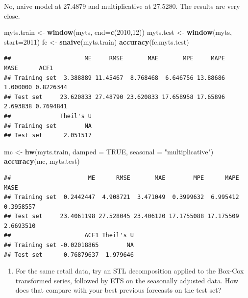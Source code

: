 \documentclass[]{article}
\newenvironment{Shaded}{\begin{snugshade}}{\end{snugshade}}
\newcommand{\KeywordTok}[1]{\textcolor[rgb]{0.13,0.29,0.53}{\textbf{#1}}}
\newcommand{\DataTypeTok}[1]{\textcolor[rgb]{0.13,0.29,0.53}{#1}}
\newcommand{\DecValTok}[1]{\textcolor[rgb]{0.00,0.00,0.81}{#1}}
\newcommand{\StringTok}[1]{\textcolor[rgb]{0.31,0.60,0.02}{#1}}
\newcommand{\OtherTok}[1]{\textcolor[rgb]{0.56,0.35,0.01}{#1}}
\newcommand{\NormalTok}[1]{#1}
\providecommand{\tightlist}{%
  \setlength{\itemsep}{0pt}\setlength{\parskip}{0pt}}
\begin{document}
No, naive model at 27.4879 and multiplicative at 27.5280. The results
are very close.

\begin{Shaded}
\begin{Highlighting}[]
\NormalTok{myts.train <-}\StringTok{ }\KeywordTok{window}\NormalTok{(myts, }\DataTypeTok{end=}\KeywordTok{c}\NormalTok{(}\DecValTok{2010}\NormalTok{,}\DecValTok{12}\NormalTok{))}
\NormalTok{myts.test <-}\StringTok{ }\KeywordTok{window}\NormalTok{(myts, }\DataTypeTok{start=}\DecValTok{2011}\NormalTok{)}
\NormalTok{fc <-}\StringTok{ }\KeywordTok{snaive}\NormalTok{(myts.train)}
\KeywordTok{accuracy}\NormalTok{(fc,myts.test)}
\end{Highlighting}
\end{Shaded}

\begin{verbatim}
##                     ME     RMSE       MAE       MPE     MAPE     MASE      ACF1
## Training set  3.388889 11.45467  8.768468  6.646756 13.88686 1.000000 0.8226344
## Test set     23.620833 27.48790 23.620833 17.658958 17.65896 2.693838 0.7694841
##              Theil's U
## Training set        NA
## Test set      2.051517
\end{verbatim}

\begin{Shaded}
\begin{Highlighting}[]
\NormalTok{mc <-}\StringTok{ }\KeywordTok{hw}\NormalTok{(myts.train, }\DataTypeTok{damped =} \OtherTok{TRUE}\NormalTok{, }\DataTypeTok{seasonal =} \StringTok{"multiplicative"}\NormalTok{)}
\KeywordTok{accuracy}\NormalTok{(mc, myts.test)}
\end{Highlighting}
\end{Shaded}

\begin{verbatim}
##                      ME      RMSE       MAE        MPE      MAPE      MASE
## Training set  0.2442447  4.908721  3.471049  0.3999632  6.995412 0.3958557
## Test set     23.4061198 27.528045 23.406120 17.1755088 17.175509 2.6693510
##                     ACF1 Theil's U
## Training set -0.02018865        NA
## Test set      0.76879637  1.979646
\end{verbatim}

\begin{enumerate}
\def\labelenumi{\arabic{enumi}.}
\setcounter{enumi}{8}
\tightlist
\item
  For the same retail data, try an STL decomposition applied to the
  Box-Cox transformed series, followed by ETS on the seasonally adjusted
  data. How does that compare with your best previous forecasts on the
  test set?
\end{enumerate}
\end{document}
